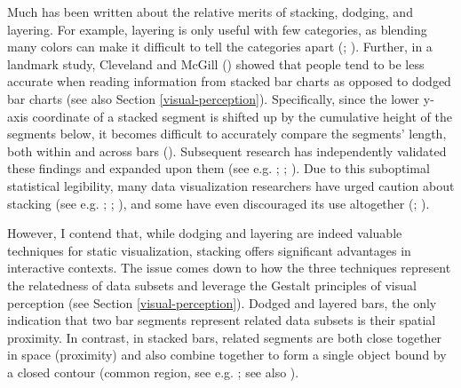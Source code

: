 \documentclass[
  openany]{book}
\theoremstyle{definition}
\theoremstyle{definition}
\theoremstyle{definition}
\theoremstyle{definition}
\theoremstyle{remark}
\begin{document}
Much has been written about the relative merits of stacking, dodging, and layering. For example, layering is only useful with few categories, as blending many colors can make it difficult to tell the categories apart (; ). Further, in a landmark study, Cleveland and McGill () showed that people tend to be less accurate when reading information from stacked bar charts as opposed to dodged bar charts (see also Section \ref{visual-perception}). Specifically, since the lower y-axis coordinate of a stacked segment is shifted up by the cumulative height of the segments below, it becomes difficult to accurately compare the segments' length, both within and across bars (). Subsequent research has independently validated these findings and expanded upon them (see e.g. ; ; ). Due to this suboptimal statistical legibility, many data visualization researchers have urged caution about stacking (see e.g. ; ; ), and some have even discouraged its use altogether (; ).

However, I contend that, while dodging and layering are indeed valuable techniques for static visualization, stacking offers significant advantages in interactive contexts. The issue comes down to how the three techniques represent the relatedness of data subsets and leverage the Gestalt principles of visual perception (see Section \ref{visual-perception}). Dodged and layered bars, the only indication that two bar segments represent related data subsets is their spatial proximity. In contrast, in stacked bars, related segments are both close together in space (proximity) and also combine together to form a single object bound by a closed contour (common region, see e.g. ; see also ).
\end{document}
